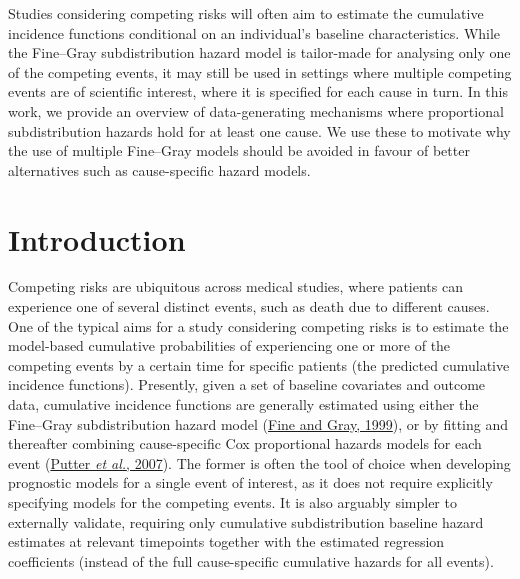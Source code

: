 \documentclass[
  letterpaper,
  DIV=11,
  numbers=noendperiod]{scrreprt}
\begin{document}
Studies considering competing risks will often aim to estimate the
cumulative incidence functions conditional on an individual's baseline
characteristics. While the Fine--Gray subdistribution hazard model is
tailor-made for analysing only one of the competing events, it may still
be used in settings where multiple competing events are of scientific
interest, where it is specified for each cause in turn. In this work, we
provide an overview of data-generating mechanisms where proportional
subdistribution hazards hold for at least one cause. We use these to
motivate why the use of multiple Fine--Gray models should be avoided in
favour of better alternatives such as cause-specific hazard models.

\hfill\break

\hypertarget{introduction-3}{%
\section{Introduction}\label{introduction-3}}

Competing risks are ubiquitous across medical studies, where patients
can experience one of several distinct events, such as death due to
different causes. One of the typical aims for a study considering
competing risks is to estimate the model-based cumulative probabilities
of experiencing one or more of the competing events by a certain time
for specific patients (the predicted cumulative incidence functions).
Presently, given a set of baseline covariates and outcome data,
cumulative incidence functions are generally estimated using either the
Fine--Gray subdistribution hazard model
(\protect\hyperlink{ref-fineProportionalHazardsModel1999}{Fine and Gray,
1999}), or by fitting and thereafter combining cause-specific Cox
proportional hazards models for each event
(\protect\hyperlink{ref-putterTutorialBiostatisticsCompeting2007}{Putter
\emph{et al.}, 2007}). The former is often the tool of choice when
developing prognostic models for a single event of interest, as it does
not require explicitly specifying models for the competing events. It is
also arguably simpler to externally validate, requiring only cumulative
subdistribution baseline hazard estimates at relevant timepoints
together with the estimated regression coefficients (instead of the full
cause-specific cumulative hazards for all events).
\end{document}
